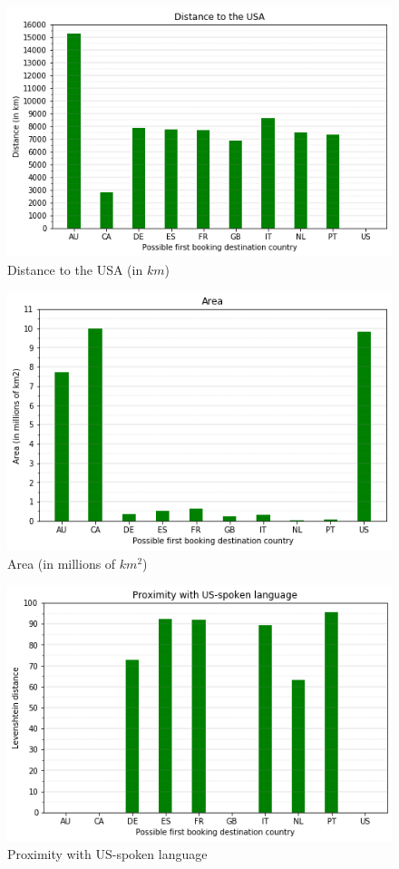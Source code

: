 \documentclass[twocolumn, switch]{article}
\begin{document}
\begin{figure}[H]
\centering
\includegraphics[scale=0.35]{../graphs/countries_distance_km}
\caption{Distance to the USA (in $km$)}
\label{fig:km}
\end{figure}

\begin{figure}[H]
\centering
\includegraphics[scale=0.35]{../graphs/countries_destination_km2}
\caption{Area (in millions of $km^{2}$)}
\label{fig:km2}
\end{figure}

\begin{figure}[H]
\centering
\includegraphics[scale=0.35]{../graphs/countries_language_levenshtein_distance}
\caption{Proximity with US-spoken language}
\label{fig:language}
\end{figure}
\end{document}
